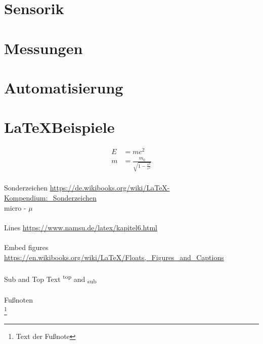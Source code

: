 \documentclass[11pt]{scrartcl}
\begin{document}
\section{Sensorik}
\clearpage

\section{Messungen}
\clearpage

\section{Automatisierung}
\clearpage


\section{\LaTeX Beispiele}
\begin{align}
E &= mc^2                 \\
m &= \frac{m_0}{\sqrt{1-\frac{v^2}{c^2}}}
\end{align}
\\
Sonderzeichen
\url{https://de.wikibooks.org/wiki/LaTeX-Kompendium:_Sonderzeichen}\\
micro - $\mu$\\
\\
Lines
\url{https://www.namsu.de/latex/kapitel6.html}\\
\\
Embed figures
\url{https://en.wikibooks.org/wiki/LaTeX/Floats,_Figures_and_Captions}\\
\\
Sub and Top Text
\textsuperscript{top} and \textsubscript{sub}\\
\\
Fußnoten\\
\footnote{Text der Fußnote}
\clearpage
\end{document}

